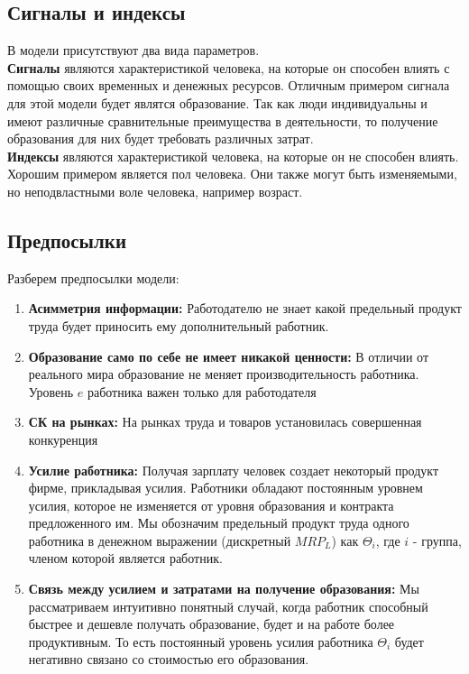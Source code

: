 \subsection{Сигналы и индексы}
\indent\setlength{\parindent}{1em}В модели присутствуют два вида параметров.\smallskip\\
\indent\setlength{\parindent}{1em}\textbf{Сигналы} являются характеристикой человека, на которые он способен влиять с помощью своих временных и денежных ресурсов. Отличным примером сигнала для этой модели будет являтся образование. Так как люди индивидуальны и имеют различные сравнительные преимущества в деятельности, то получение образования для них будет требовать различных затрат.\smallskip\\
\indent\setlength{\parindent}{1em}\textbf{Индексы} являются характеристикой человека, на которые он не способен влиять. Хорошим примером является пол человека. Они также могут быть изменяемыми, но неподвластными воле человека, например возраст.
\subsection{Предпосылки}
\indent\setlength{\parindent}{1em}Разберем предпосылки модели:
\begin{enumerate}
    \item \textbf{Асимметрия информации:} Работодателю не знает какой предельный продукт труда будет приносить ему
    дополнительный работник.
    \item \textbf{Образование само по себе не имеет никакой ценности:} В отличии от реального мира образование не
    меняет производительность работника. Уровень $e$ работника важен только для работодателя
    \item \textbf{СК на рынках:} На рынках труда и товаров установилась совершенная конкуренция
    \item \textbf{Усилие работника:} Получая зарплату человек создает некоторый продукт фирме, прикладывая усилия.
    Работники обладают постоянным уровнем усилия, которое не изменяется от уровня образования и контракта
    предложенного им. Мы обозначим предельный продукт труда одного работника в денежном выражении (дискретный $MRP_L$)
    как $\Theta_i$, где $i$ - группа, членом которой является работник.
    \item \textbf{Связь между усилием и затратами на получение образования:} Мы рассматриваем интуитивно понятный
    случай, когда работник способный быстрее и дешевле получать образование, будет и на работе более продуктивным. То
    есть постоянный уровень усилия работника $\Theta_i$ будет негативно связано со стоимостью его образования.
\end{enumerate}
